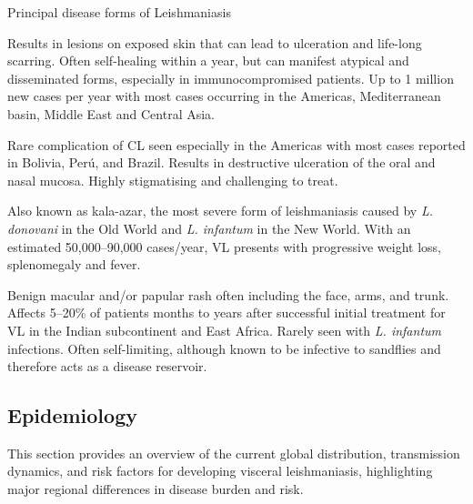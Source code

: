 \begin{mybox}{Principal disease forms of Leishmaniasis\cite{who_leish,farrar2023manson}}\label{box:main-four}
  \begin{description}[nosep]
    \item[Cutaneous leishmaniasis (CL)] Results in lesions on exposed skin that can lead to ulceration and life-long scarring. Often self-healing within a year, but can manifest atypical and disseminated forms, especially in immunocompromised patients. Up to 1 million new cases per year with most cases occurring in the Americas, Mediterranean basin, Middle East and Central Asia.
    \item[Mucocutaneous leishmaniasis (MCL)] Rare complication of CL seen especially in the Americas with most cases reported in Bolivia, Perú, and Brazil. Results in destructive ulceration of the oral and nasal mucosa. Highly stigmatising and challenging to treat.
    \item[Visceral leishmaniasis (VL)] Also known as kala-azar, the most severe form of leishmaniasis caused by \textit{L. donovani} in the Old World and \textit{L. infantum} in the New World. With an estimated 50,000--90,000 cases/year, VL presents with progressive weight loss, splenomegaly and fever.
    \item[Post kala--azar dermal leishmaniasis (PKDL)] Benign macular and/or papular rash often including the face, arms, and trunk.  Affects 5--20\% of patients months to years after successful initial treatment for VL in the Indian subcontinent and East Africa. Rarely seen with \textit{L. infantum} infections. Often self-limiting, although known to be infective to sandflies and therefore acts as a disease reservoir.
  \end{description}
\end{mybox}

\subsection{Epidemiology}

This section provides an overview of the current global distribution, transmission dynamics, and risk factors for developing visceral leishmaniasis, highlighting major regional differences in disease burden and risk.

